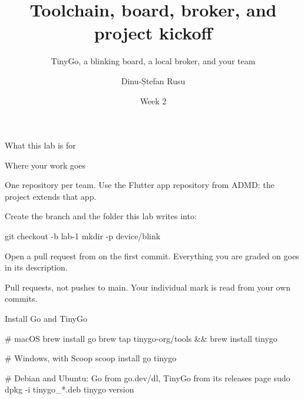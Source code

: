 \documentclass[10pt,aspectratio=169,t]{beamer}
\title{Toolchain, board, broker, and project kickoff}
\subtitle{TinyGo, a blinking board, a local broker, and your team}
\author{Dinu-Ștefan Rusu}
\institute{FILS, Universitatea Politehnica București}
\date{Week 2}
\begin{document}
\titleframe

\begin{frame}[eyebrow=Today]{What this lab is for}
  \vskip 2mm
  \begin{grid}[2]
  \end{grid}
  \vskip 8mm
  \vskip 3mm
\end{frame}

\begin{frame}[fragile,eyebrow=Setup]{Where your work goes}
  \begin{steps}
    \item One repository per team. Use the Flutter app repository from ADMD: the project extends that app.
    \item Create the branch and the folder this lab writes into:
\begin{shell}
git checkout -b lab-1
mkdir -p device/blink
\end{shell}
    \item Open a pull request from  on the first commit. Everything you are graded on goes in its description.
  \end{steps}
  \begin{hint}
    Pull requests, not pushes to main. Your individual mark is read from your own commits.
  \end{hint}
\end{frame}

\begin{frame}[fragile,eyebrow=Setup]{Install Go and TinyGo}
  \vskip 1mm
\begin{shell}
# macOS
brew install go
brew tap tinygo-org/tools && brew install tinygo

# Windows, with Scoop
scoop install go tinygo

# Debian and Ubuntu: Go from go.dev/dl, TinyGo from its releases page
sudo dpkg -i tinygo_*.deb
tinygo version
\end{shell}
\end{frame}
\end{document}
